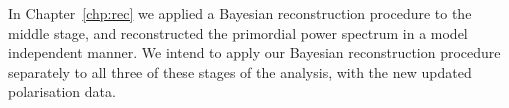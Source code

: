 \begin{center}
\end{center}

In Chapter~\ref{chp:rec} we applied a Bayesian reconstruction procedure to the middle stage, and reconstructed the primordial power spectrum in a model independent manner.  
We intend to apply our Bayesian reconstruction procedure separately to all three of these stages of the analysis, with the new updated polarisation data.
